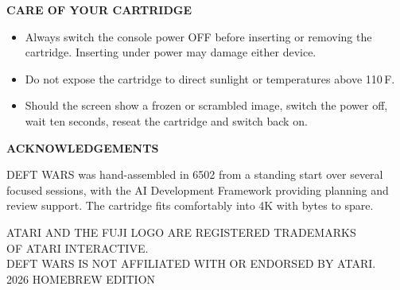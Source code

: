 \documentclass[10pt]{article}
\newcommand{\sectionrule}[1]{%
  \par\vspace{6pt}%
  \noindent\colorbox{atariOrange}{\parbox{\dimexpr\linewidth-2\fboxsep\relax}{\strut\textcolor{atariCream}{\textbf{\textsf{\MakeUppercase{#1}}}}\hfill}}%
  \par\vspace{4pt}%
}
\begin{document}
\sectionrule{Care of Your Cartridge}
\begin{itemize}\itemsep0pt
\item Always switch the console power OFF before inserting or removing
      the cartridge. Inserting under power may damage either device.
\item Do not expose the cartridge to direct sunlight or temperatures
      above 110\,\textdegree{}F.
\item Should the screen show a frozen or scrambled image, switch the
      power off, wait ten seconds, reseat the cartridge and switch
      back on.
\end{itemize}

\sectionrule{Acknowledgements}

DEFT WARS was hand-assembled in 6502 from a standing start over several
focused sessions, with the AI Development Framework providing planning
and review support. The cartridge fits comfortably into 4K with bytes to
spare.

\vspace{4mm}
\begin{center}\sffamily\footnotesize
ATARI\textregistered{} AND THE FUJI LOGO ARE REGISTERED TRADEMARKS\\
OF ATARI INTERACTIVE.\\[2pt]
DEFT WARS IS NOT AFFILIATED WITH OR ENDORSED BY ATARI.\\[6pt]
\textcopyright{} 2026 \textbullet{} HOMEBREW EDITION
\end{center}

\vfill
\begin{center}
\end{center}
\end{document}

